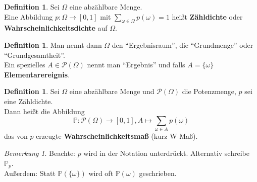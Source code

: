 \documentclass[10pt,a4paper]{article}
\newcommand{\Potset}{\mathscr P}
\newcommand{\Prb}{\mathbb P}
\theoremstyle{plain}
\theoremstyle{definition}
\newtheorem{definition}[theorem]{Definition}
\theoremstyle{remark}
\newtheorem{bem}[theorem]{Bemerkung}
\begin{document}
	\begin{definition}\label{0103def}
		Sei $\Omega$ eine abzählbare Menge.\\
		Eine Abbildung $p:\Omega\to[0,1]$ mit $\sum_{\omega\in\Omega}p(\omega)=1$ heißt \textbf{Zähldichte} oder \textbf{Wahrscheinlichkeitsdichte} auf $\Omega$.
	\end{definition}

	\begin{definition}\label{0104def}
		Man nennt dann $\Omega$ den \enquote{Ergebnisraum}, die \enquote{Grundmenge} oder \enquote{Grundgesamtheit}.\\
		Ein spezielles $A\in\Potset(\Omega)$ nennt man \enquote{Ergebnis} und falls $A=\{\omega\}$ \textbf{Elementarereignis}.
	\end{definition}

	\begin{definition}\label{0105def}
		Sei $\Omega$ eine abzählbare Menge und $\Potset(\Omega)$ die Potenzmenge, $p$ sei eine Zähldichte.\\
		Dann heißt die Abbildung 
		\[\Prb:\Potset(\Omega)\to[0,1],A\mapsto \sum_{\omega\in A}p(\omega)\]
		 das von $p$ erzeugte \textbf{Wahrscheinlichkeitsmaß} (kurz W-Maß).
	\end{definition}
	
	\begin{bem}\label{0106bem}
		Beachte: $p$ wird in der Notation unterdrückt. Alternativ schreibe $\Prb_p$.\\
		Außerdem: Statt $\Prb(\{\omega\})$ wird oft $\Prb(\omega)$ geschrieben.
	\end{bem}
	
\end{document}
